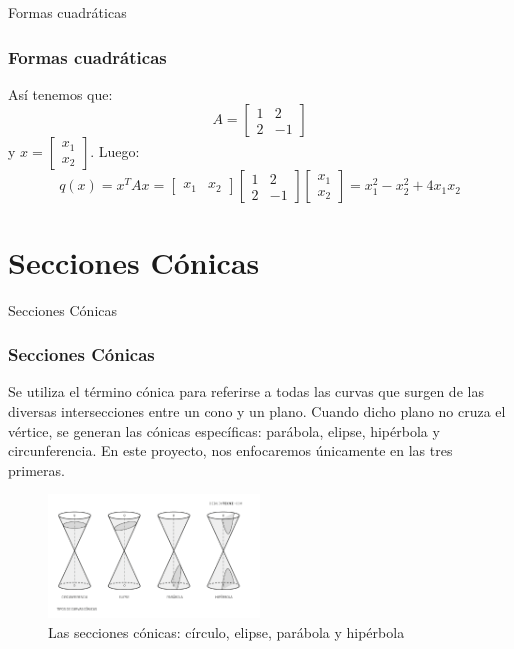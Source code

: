 \documentclass[xcolor={dvipsnames},aspectratio=169,10pt]{beamer}
\begin{document}
\begin{frame}{Formas cuadráticas}
  \frametitle{Formas cuadráticas}
  Así tenemos que:
  \begin{equation*}
    A = \begin{bmatrix}
      1 & 2 \\
      2 & -1
    \end{bmatrix}
  \end{equation*}
  y $x = \begin{bmatrix}
    x_1 \\
    x_2
  \end{bmatrix}$.
  Luego:
  \begin{equation*}
    q(x) = x^{T}Ax = \begin{bmatrix}
      x_1 & x_2
    \end{bmatrix}
    \begin{bmatrix}
      1 & 2 \\
      2 & -1
    \end{bmatrix}
    \begin{bmatrix}
      x_1 \\
      x_2
    \end{bmatrix}
    = x_1^2 - x_2^2 + 4x_1x_2
  \end{equation*}
\end{frame}

\section{Secciones Cónicas}

\begin{frame}{Secciones Cónicas}
  \frametitle{Secciones Cónicas}
  Se utiliza el término cónica para referirse a todas las curvas que surgen de las diversas intersecciones entre un cono y un plano. 
  Cuando dicho plano no cruza el vértice, se generan las cónicas específicas: parábola, elipse, hipérbola y circunferencia. 
  En este proyecto, nos enfocaremos únicamente en las tres primeras. 
  \begin{figure}
    \includegraphics[width=0.5\textwidth, height=0.6\textheight, keepaspectratio]{images/conics.png}
    \caption{Las secciones cónicas: círculo, elipse, parábola y hipérbola}
  \end{figure}
\end{frame}
\end{document}
